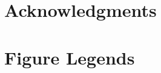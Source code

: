 \documentclass[10pt]{article}
\begin{document}



\section*{Acknowledgments} %



\clearpage




\clearpage
\section*{Figure Legends} %
\end{document}

